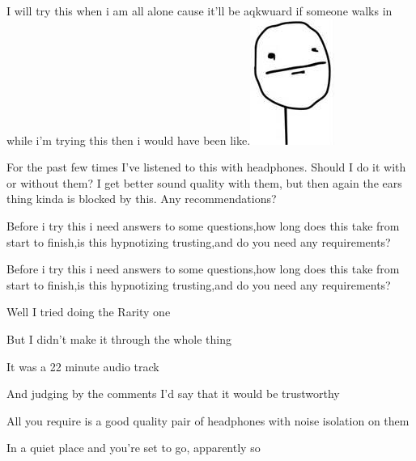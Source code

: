 \documentclass[ebook,12pt,oneside,openany]{memoir}
\newcommand{\mytexttilde}{\raisebox{0.5ex}{\texttildelow}}
\begin{document}
\begin{tcolorbox}[title=\mytexttilde{}TheStealthyPony\mytexttilde{},colback=yellow!5!white,colframe=yellow!75!black,coltitle=white]
\par{I will try this when i am all alone cause it'll be aqkwuard if someone walks in while i'm trying this then i would have been like.\href{https://buffy.mlpforums.com/monthly\_01\_2013/post-11728-0-84258400-1359089193.jpg}{\includegraphics{images/post-11728-0-84258400-1359089193.jpg}}}
\end{tcolorbox}
\begin{tcolorbox}[title=Admiral Colt]
\par{For the past few times I've listened to this with headphones. Should I do it with or without them? I get better sound quality with them, but then again the ears thing kinda is blocked by this. Any recommendations?}
\end{tcolorbox}
\begin{tcolorbox}[title=\mytexttilde{}TheStealthyPony\mytexttilde{},colback=yellow!5!white,colframe=yellow!75!black,coltitle=white]
\par{Before i try this i need answers to some questions,how long does this take from start to finish,is this hypnotizing trusting,and do you need any requirements?}
\end{tcolorbox}
\begin{tcolorbox}[title=Moog the Kvlt]
\begin{tcolorbox}[title=\mytexttilde{}TheStealthyPony\mytexttilde{}]
\par{Before i try this i need answers to some questions,how long does this take from start to finish,is this hypnotizing trusting,and do you need any requirements?}
\end{tcolorbox}
\par{Well I tried doing the Rarity one}
\par{But I didn't make it through the whole thing}
\par{It was a 22 minute audio track}
\par{And judging by the comments I'd say that it would be trustworthy}
\par{All you require is a good quality pair of headphones with noise isolation on them}
\par{In a quiet place and you're set to go, apparently so}
\end{tcolorbox}
\end{document}
